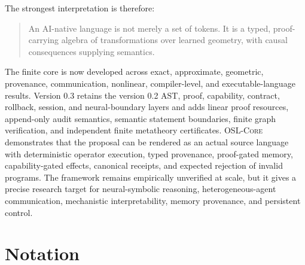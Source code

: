 \documentclass[11pt]{article}
\theoremstyle{definition}
\theoremstyle{remark}
\newcommand{\OSLCore}{\textnormal{\textsc{OSL-Core}}\xspace}
\begin{document}
The strongest interpretation is therefore:
\begin{quote}
An AI-native language is not merely a set of tokens. It is a typed, proof-carrying algebra of transformations over learned geometry, with causal consequences supplying semantics.
\end{quote}
The finite core is now developed across exact, approximate, geometric, provenance, communication, nonlinear, compiler-level, and executable-language results. Version 0.3 retains the version 0.2 AST, proof, capability, contract, rollback, session, and neural-boundary layers and adds linear proof resources, append-only audit semantics, semantic statement boundaries, finite graph verification, and independent finite metatheory certificates. \OSLCore demonstrates that the proposal can be rendered as an actual source language with deterministic operator execution, typed provenance, proof-gated memory, capability-gated effects, canonical receipts, and expected rejection of invalid programs. The framework remains empirically unverified at scale, but it gives a precise research target for neural-symbolic reasoning, heterogeneous-agent communication, mechanistic interpretability, memory provenance, and persistent control.

\appendix

\section{Notation}
\end{document}
